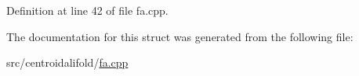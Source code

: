 Definition at line 42 of file fa.\+cpp.



The documentation for this struct was generated from the following file\+:\begin{DoxyCompactItemize}
\item 
src/centroidalifold/\hyperlink{centroidalifold_2fa_8cpp}{fa.\+cpp}\end{DoxyCompactItemize}
